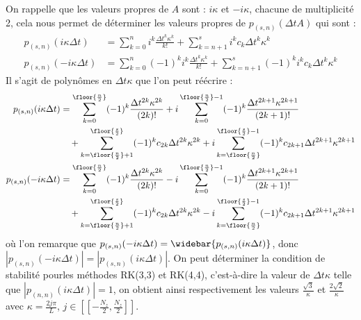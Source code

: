 On rappelle que les valeurs propres de $A$ sont : $i\kappa$ et $-i\kappa$, chacune de multiplicité 2, cela nous permet de déterminer les valeurs propres de $p_{(s,n)}(\Delta t A)$ qui sont :
$$
  \begin{aligned}
    p_{(s,n)}( i\kappa\Delta t) &= \sum_{k=0}^n       i^k\frac{\Delta t^k\kappa^k}{k!} + \sum_{k=n+1}^s       i^kc_k\Delta t^k\kappa^k \\
    p_{(s,n)}(-i\kappa\Delta t) &= \sum_{k=0}^n (-1)^ki^k\frac{\Delta t^k\kappa^k}{k!} + \sum_{k=n+1}^s (-1)^ki^kc_k\Delta t^k\kappa^k
  \end{aligned}
$$
Il s'agit de polynômes en $\Delta t\kappa$ que l'on peut réécrire :
$$
  \begin{aligned}
    p_{(s,n)}( i\kappa\Delta t) &=  \sum_{k=0}^{ \floor{\frac{n}{2}}   }(-1)^k\frac{\Delta t^{2k}\kappa^{2k}}{(2k)!}
                                 + i\sum_{k=0}^{ \floor{\frac{n}{2}}-1 }(-1)^k\frac{\Delta t^{2k+1}\kappa^{2k+1}}{(2k+1)!}\\
                                 &\quad+  \sum_{k=\floor{\frac{n}{2}}+1}^{ \floor{\frac{s}{2}}   } (-1)^k c_{2k}\Delta t^{2k}\kappa^{2k}
                                       + i\sum_{k=\floor{\frac{n}{2}}  }^{ \floor{\frac{s}{2}}-1 } (-1)^k c_{2k+1}\Delta t^{2k+1}\kappa^{2k+1} \\
    p_{(s,n)}(-i\kappa\Delta t) &=  \sum_{k=0}^{ \floor{\frac{n}{2}}   }(-1)^k\frac{\Delta t^{2k}\kappa^{2k}}{(2k)!}
                                 - i\sum_{k=0}^{ \floor{\frac{n}{2}}-1 }(-1)^k\frac{\Delta t^{2k+1}\kappa^{2k+1}}{(2k+1)!}\\
                                 &\quad+  \sum_{k=\floor{\frac{n}{2}}+1}^{ \floor{\frac{s}{2}}   } (-1)^k c_{2k}\Delta t^{2k}\kappa^{2k}
                                       - i\sum_{k=\floor{\frac{n}{2}}  }^{ \floor{\frac{s}{2}}-1 } (-1)^k c_{2k+1}\Delta t^{2k+1}\kappa^{2k+1} \\
  \end{aligned}
$$
où l'on remarque que $p_{(s,n)}(-i\kappa\Delta t) = \widebar{p_{(s,n)}(i\kappa\Delta t)}$, donc $\left|p_{(s,n)}(-i\kappa\Delta t)\right|=\left|p_{(s,n)}(i\kappa\Delta t)\right|$. On peut déterminer la condition de stabilité pourles méthodes RK(3,3) et RK(4,4), c'est-à-dire la valeur de $\Delta t\kappa$ telle que $|p_{(n,n)}(i\kappa\Delta t)|=1$, on obtient ainsi respectivement les valeurs $\frac{\sqrt{3}}{\kappa}$ et $\frac{2\sqrt{2}}{\kappa}$ avec $\kappa = \frac{2j\pi}{L}$, $j\in[\![-\frac{N_z}{2},\frac{N_z}{2}]\!]$.


